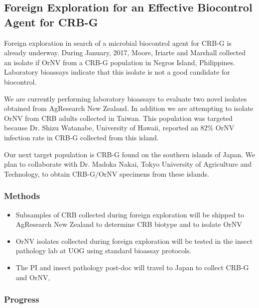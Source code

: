 \documentclass[12pt,letterpaper,english,bibliography=totocnumbered,abstract=on]{scrartcl}
\begin{document}
\newpage
\begin{framed}
\subsection{Foreign Exploration for an Effective Biocontrol Agent for CRB-G}

Foreign exploration in search of a microbial biocontrol agent for CRB-G is already underway. During January, 2017, Moore, Iriarte and Marshall collected an isolate if OrNV from a CRB-G population in Negros Island, Philippines. Laboratory bioassays indicate that this isolate is not a good candidate for biocontrol.

We are currently performing laboratory bioassays to evaluate two novel isolates obtained from AgResearch New Zealand. In addition we are attempting to isolate OrNV from CRB adults collected in Taiwan. This population was targeted because Dr. Shizu Watanabe, University of Hawaii, reported an 82\% OrNV infection rate in CRB-G collected from this island.

Our next target population is CRB-G found on the southern islands of Japan. We plan to collaborate with Dr. Madoka Nakai, Tokyo University of Agriculture and Technology, to obtain CRB-G/OrNV specimens from these islands.

\subsubsection{Methods}

\begin{itemize}
	\item Subsamples of CRB collected during foreign exploration will be shipped to AgResearch New Zealand to determine CRB biotype and to isolate OrNV
	\item OrNV isolates collected during foreign exploration will be tested in the insect pathology lab at UOG using standard bioassay protocols.
	\item The PI and insect pathology post-doc will travel to Japan to collect CRB-G and OrNV, 
\end{itemize}
\end{framed}

\subsubsection{Progress}
\end{document}
